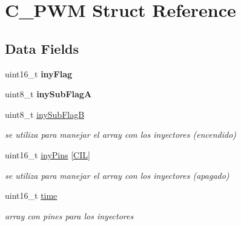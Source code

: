 \hypertarget{structC__PWM}{}\section{C\+\_\+\+P\+WM Struct Reference}
\label{structC__PWM}
\subsection*{Data Fields}
\begin{DoxyCompactItemize}
\item 
\mbox{\label{structC__PWM_abea181b6b90f476a8082a31a92574003}} 
uint16\+\_\+t {\bfseries iny\+Flag}
\item 
\mbox{\label{structC__PWM_ab3ae7f2def7b17f3fcd3ae8164e2ec81}} 
uint8\+\_\+t {\bfseries iny\+Sub\+FlagA}
\item 
\mbox{\label{structC__PWM_afea15442fe64fbfb915cefd6538bc1b9}} 
uint8\+\_\+t \hyperlink{structC__PWM_afea15442fe64fbfb915cefd6538bc1b9}{iny\+Sub\+FlagB}
\begin{DoxyCompactList}\small\item\em se utiliza para manejar el array con los inyectores (encendido) \end{DoxyCompactList}\item 
\mbox{\label{structC__PWM_a971dcd6bcf8df62e73d10b7b0c2cd3e3}} 
uint16\+\_\+t \hyperlink{structC__PWM_a971dcd6bcf8df62e73d10b7b0c2cd3e3}{iny\+Pins} \mbox{[}\hyperlink{defines_8h_a45f252e6f7774e84484118243dfe45b4}{C\+IL}\mbox{]}
\begin{DoxyCompactList}\small\item\em se utiliza para manejar el array con los inyectores (apagado) \end{DoxyCompactList}\item 
\mbox{\label{structC__PWM_aef386c055cd62c75702d2866bbb1b7b6}} 
uint16\+\_\+t \hyperlink{structC__PWM_aef386c055cd62c75702d2866bbb1b7b6}{time}
\begin{DoxyCompactList}\small\item\em array con pines para los inyectores \end{DoxyCompactList}\item 
\mbox{\label{structC__PWM_a6b4fd2b57fa098738a9151c875fcef5d}} 

\end{DoxyCompactItemize}
